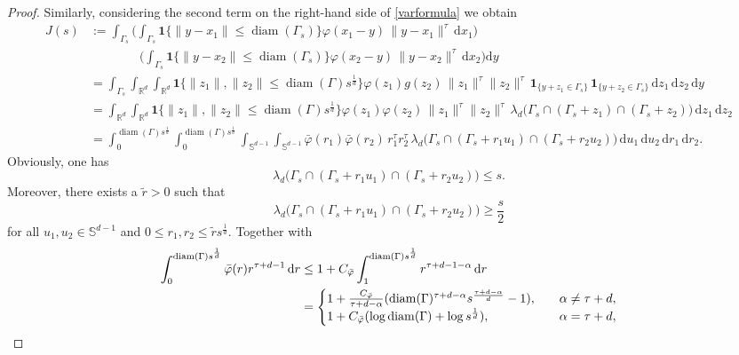 \documentclass{article}
\theoremstyle{definition}
\numberwithin{equation}{section}
\theoremstyle{remark}
\begin{document}
\begin{proof}
Similarly, considering the second term on the right-hand side of \eqref{varformula} we obtain
\begin{align*}
J(s) 
  &:= \int_{\Gamma_s}\!
     \Bigg(\int_{\Gamma_s} \mathbf{1}\{\|y-x_1\|\leq \operatorname{diam}(\Gamma_s)\} \varphi(x_1-y)\,\|y-x_1\|^{\tau}\,\mathrm{d}x_1\Bigg) \\
     & \qquad \qquad \Bigg(\int_{\Gamma_s} \mathbf{1}\{\|y-x_2\|\leq \operatorname{diam}(\Gamma_s)\} \varphi(x_2-y)\,\|y-x_2\|^{\tau}\,\mathrm{d}x_2\Bigg)
     \mathrm{d}y \\[0.4em]
  &= \int_{\Gamma_s}\!
     \int_{\mathbb{R}^d}\!\int_{\mathbb{R}^d} \mathbf{1}\{\|z_1\|,\|z_2\|\leq \operatorname{diam}(\Gamma) s^{\frac{1}{d}}\}
        \varphi(z_1)g(z_2)\,\|z_1\|^{\tau}\|z_2\|^{\tau}\,
        \mathbf{1}_{\{y+z_1\in \Gamma_s\}}\,
        \mathbf{1}_{\{y+z_2\in \Gamma_s\}}\,
        \mathrm{d}z_1\,\mathrm{d}z_2\,\mathrm{d}y \\[0.4em]
  &= \int_{\mathbb{R}^d}\!\int_{\mathbb{R}^d} \mathbf{1}\{\|z_1\|,\|z_2\|\leq \operatorname{diam}(\Gamma) s^{\frac{1}{d}}\}
        \varphi(z_1)\varphi(z_2)\,\|z_1\|^{\tau}\|z_2\|^{\tau}\,
        \lambda_d\!\big(\Gamma_s\cap(\Gamma_s+z_1)\cap(\Gamma_s+z_2)\big)\,
        \mathrm{d}z_1\,\mathrm{d}z_2 \\[0.6em]
  &= \int_{0}^{\operatorname{diam}(\Gamma) s^{\frac{1}{d}}}\!\!\int_{0}^{\operatorname{diam}(\Gamma) s^{\frac{1}{d}}}
     \int_{\mathbb{S}^{d-1}}\!\int_{\mathbb{S}^{d-1}}
        \bar{\varphi}(r_1)\bar{\varphi}(r_2)\,r_1^{\tau}r_2^{\tau}\,
      \lambda_d\!\big(\Gamma_s\cap(\Gamma_s+r_1 u_1)\cap(\Gamma_s+r_2 u_2)\big)\,
        \mathrm{d}u_1\,\mathrm{d}u_2\,
        \mathrm{d}r_1\,\mathrm{d}r_2.
\end{align*}
Obviously, one has
$$
\lambda_d\!\big(\Gamma_s\cap(\Gamma_s+r_1 u_1)\cap(\Gamma_s+r_2 u_2)\big) \leq s.
$$
Moreover, there exists a $\tilde{r}>0$ such that
$$
\lambda_d\!\big(\Gamma_s\cap(\Gamma_s+r_1 u_1)\cap(\Gamma_s+r_2 u_2)\big) \geq \frac{s}{2}
$$
for all $u_1,u_2\in \mathbb{S}^{d-1}$ and $0\le r_1,r_2\leq \tilde{r} s^{\frac{1}{d}}$. Together with
\begin{align}
 \int_{0}^{\operatorname{diam}(\Gamma) s^{\frac{1}{d}}} \bar{\varphi}(r) r^{\tau+d-1} \, \mathrm{d}r & \leq 1+ C_{\bar{\varphi}} \int_1^{\operatorname{diam}(\Gamma) s^{\frac{1}{d}}} r^{\tau+d-1-\alpha} \, \mathrm{d}r \notag \\
& = \begin{cases} 1 + \frac{C_{\bar{\varphi}}}{\tau+d-\alpha} (\operatorname{diam}(\Gamma)^{\tau+d-\alpha} s^{\frac{\tau+d-\alpha}{d}}-1), & \quad \alpha\neq \tau+d, \\ 1 + C_{\bar{\varphi}} ( \log \operatorname{diam}(\Gamma) + \log s^{\frac{1}{d}}), & \quad \alpha= \tau+d,  \end{cases} \label{eqn:upper_bound_barvarphi}

\end{align}
\end{proof}
\end{document}
